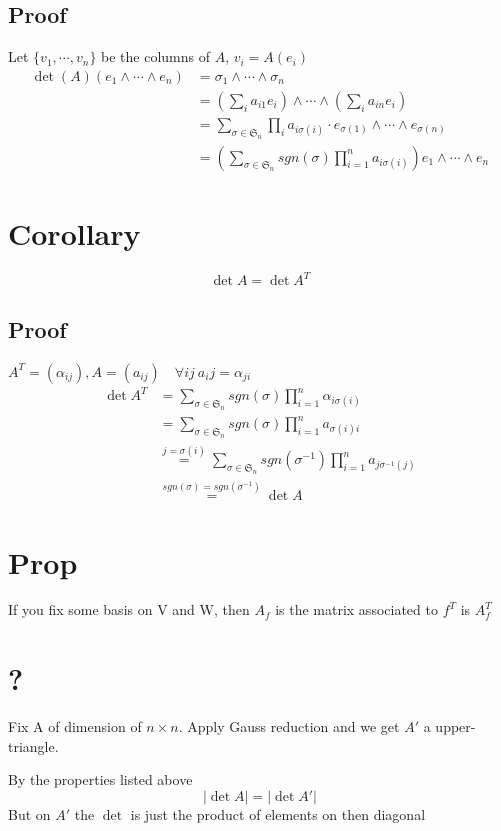 \documentclass{book}
\newcommand{\abs}[1]{\left\lvert #1 \right\rvert}
\begin{document}
\subsection*{Proof}
Let $\{v_1,\cdots,v_n\}$ be the columns of $A$, $v_i=A(e_i)$
$$\begin{aligned}
    \det(A)(e_1\wedge\cdots\wedge e_n) &=\sigma_1\wedge\cdots\wedge\sigma_n\\
    &=(\sum\limits_ia_{i1}e_i)\wedge\cdots\wedge(\sum\limits_ia_{in}e_i)\\
    &=\sum\limits_{\sigma\in\mathfrak{S}_n}\prod\limits_ia_{i\sigma(i)}\cdot e_{\sigma(1)}\wedge\cdots\wedge e_{\sigma(n)}\\
    &=(\sum\limits_{\sigma\in\mathfrak{S}_n}sgn(\sigma)\prod\limits_{i=1}^na_{i\sigma(i)})e_1\wedge\cdots\wedge e_n
\end{aligned}$$
\section{Corollary}
$$\det A=\det A^T$$
\subsection*{Proof}
$A^T=(\alpha_{ij}), A=(a_{ij})\quad \forall ij\ a_ij=\alpha_{ji}$
$$\begin{aligned}
    \det A^T &=\sum\limits_{\sigma\in\mathfrak{S}_n}sgn(\sigma)\prod\limits_{i=1}^n\alpha_{i\sigma(i)}\\
    &=\sum\limits_{\sigma\in\mathfrak{S}_n}sgn(\sigma)\prod\limits_{i=1}^na_{\sigma(i)i}\\
    &\overset{j=\sigma(i)}{=}\sum\limits_{\sigma\in\mathfrak{S}_n}sgn(\sigma^{-1})\prod\limits_{i=1}^na_{j\sigma^{-1}(j)}\\
    &\overset{sgn(\sigma)=sgn(\sigma^{-1})}{=}\det A
\end{aligned}$$
\section{Prop}
If you fix some basis on V and W, then $A_f$ is the matrix associated to $f^T$ is $A_f^T$
\section{?}
Fix  A of dimension of $n\times n$. Apply Gauss reduction and we get $A'$ a upper-triangle.

By the properties listed above$$\abs{\det A}=\abs{\det A'}$$
But on $A'$ the $\det$ is just the product of elements on then diagonal
\end{document}
